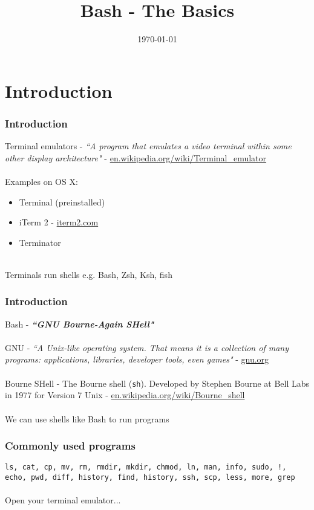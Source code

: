 \documentclass{beamer}
\title[Bash]{Bash - The Basics} %
\author{} %
\institute[] %
{
 \\ %
\medskip
\textit{chris@cjwfuller.com}
}
\date{\today}
\begin{document}
\begin{frame}
\titlepage
\end{frame}

\section{Introduction}

\begin{frame}
\frametitle{Introduction}
Terminal emulators  - \textit{``A program that emulates a video terminal within some other display architecture"} - \url{en.wikipedia.org/wiki/Terminal_emulator}
\\~\\
Examples on OS X:
\begin{itemize}
	\item Terminal (preinstalled)
	\item iTerm 2 - \url{iterm2.com}
	\item Terminator
\end{itemize}
~\\
Terminals run shells e.g. Bash, Zsh, Ksh, fish
\end{frame}


\begin{frame}
\frametitle{Introduction}
Bash - \textbf{\textit{``GNU Bourne-Again SHell"}}
\\~\\
GNU - \textit{``A Unix-like operating system. That means it is a collection of many programs: applications, libraries, developer tools, even games"} - \url{gnu.org}
\\~\\
Bourne SHell - The Bourne shell (\texttt{sh}).  Developed by Stephen Bourne at Bell Labs in 1977 for Version 7 Unix - \url{en.wikipedia.org/wiki/Bourne_shell}
\\~\\
We can use shells like Bash to run programs
\end{frame}


\begin{frame}
\frametitle{Commonly used programs}
\texttt{ls, cat, cp, mv, rm, rmdir, mkdir, chmod, ln, man, info, sudo, !, echo, pwd, diff, history, find, history, ssh, scp, less, more, grep}
\\~\\
Open your terminal emulator...
\end{frame}


\begin{frame}[fragile]
\frametitle{}
	\scriptsize
	\begin{verbatim}
	\end{verbatim}
\end{frame}
\end{document}
